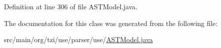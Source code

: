 Definition at line 306 of file A\-S\-T\-Model.\-java.



The documentation for this class was generated from the following file\-:\begin{DoxyCompactItemize}
\item 
src/main/org/tzi/use/parser/use/\hyperlink{_a_s_t_model_8java}{A\-S\-T\-Model.\-java}\end{DoxyCompactItemize}
